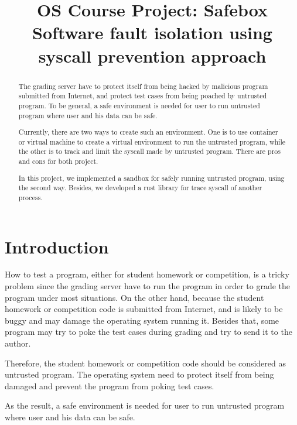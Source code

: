 \documentclass[conference,compsoc]{IEEEtran}
\begin{document}
\title{
	OS Course Project: Safebox\\ 
	Software fault isolation using syscall prevention approach
}


\author{
\and
}

\maketitle

\begin{abstract}
	The grading server have to protect itself from being hacked by malicious program submitted from Internet, and protect test cases from being poached by untrusted program. 
	To be general, a safe environment is needed for user to run untrusted program where user and his data can be safe. 
	\par
	Currently, there are two ways to create such an environment. 
	One is to use container or virtual machine to create a virtual environment to run the untrusted program, while the other is to track and limit the syscall made by untrusted program. 
	There are pros and cons for both project.
	\par
	In this project, we implemented a sandbox for safely running untrusted program, using the second way. 
	Besides, we developed a rust library for trace syscall of another process.
\end{abstract}

\section{Introduction}
	\par
		How to test a program, either for student homework or competition, is a tricky problem since the grading server have to run the program in order to grade the program under most situations. 
		On the other hand, because the student homework or competition code is submitted from Internet, and is likely to be buggy and may damage the operating system running it. 
		Besides that, some program may try to poke the test cases during grading and try to send it to the author.
		\par
		Therefore, the student homework or competition code should be considered as untrusted program. 
		The operating system need to protect itself from being damaged and prevent the program from poking test cases.
	\par
		As the result, a safe environment is needed for user to run untrusted program where user and his data can be safe. 
\end{document}

